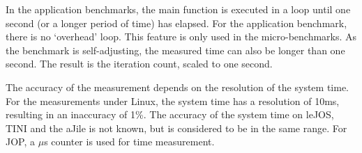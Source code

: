 In the application benchmarks, the main function is executed in a
loop until one second (or a longer period of time) has elapsed. For
the application benchmark, there is no `overhead' loop. This feature
is only used in the micro-benchmarks. As the benchmark is
self-adjusting, the measured time can also be longer than one
second. The result is the iteration count, scaled to one second.

The accuracy of the measurement depends on the resolution of the
system time. For the measurements under Linux, the system time has a
resolution of 10ms, resulting in an inaccuracy of 1\%. The accuracy
of the system time on leJOS, TINI and the aJile is not known, but is
considered to be in the same range. For JOP, a $\mu$s counter is
used for time measurement.



